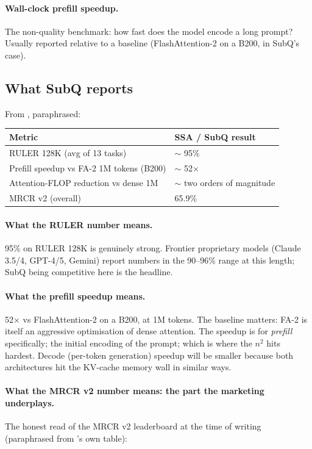 \paragraph{Wall-clock prefill speedup.} The non-quality benchmark: how
fast does the model encode a long prompt? Usually reported relative to a
baseline (FlashAttention-2 on a B200, in SubQ's case).

\subsection{What SubQ reports}

From \citet{subq2026ssa}, paraphrased:

\begin{center}
\begin{tabular}{ll}
\toprule
Metric & SSA / SubQ result \\
\midrule
RULER \@ 128K (avg of 13 tasks) & \(\sim\) 95\% \\
Prefill speedup vs FA-2 \@ 1M tokens (B200) & \(\sim\) 52$\times$ \\
Attention-FLOP reduction vs dense \@ 1M & \(\sim\) two orders of magnitude \\
MRCR v2 (overall) & 65.9\% \\
\bottomrule
\end{tabular}
\end{center}

\paragraph{What the RULER number means.} 95\% on RULER \@ 128K is
genuinely strong. Frontier proprietary models (Claude 3.5/4, GPT-4/5,
Gemini) report numbers in the 90--96\% range at this length; SubQ being
competitive here is the headline.

\paragraph{What the prefill speedup means.} 52$\times$ vs FlashAttention-2
on a B200, at 1M tokens. The baseline matters: FA-2 is itself an
aggressive optimisation of dense attention. The speedup is for
\emph{prefill} specifically; the initial encoding of the prompt; which
is where the \(n^2\) hits hardest. Decode (per-token generation) speedup
will be smaller because both architectures hit the KV-cache memory wall
in similar ways.

\paragraph{What the MRCR v2 number means: the part the marketing
underplays.} The honest read of the MRCR v2 leaderboard at the time of
writing (paraphrased from \citealp{subq2026ssa}'s own table):

